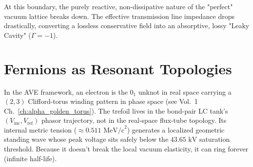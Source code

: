 At this boundary, the purely reactive, non-dissipative nature of the "perfect" vacuum lattice breaks down. The effective transmission line impedance drops drastically, converting a lossless conservative field into an absorptive, lossy "Leaky Cavity" ($\Gamma = -1$\gammaundeclared{}).


\section{Fermions as Resonant Topologies}
In the AVE framework, an electron is the $0_1$ unknot in real space carrying a $(2, 3)$ Clifford-torus winding pattern in phase space (see Vol.~1 Ch.~\ref{ch:alpha_golden_torus}). The trefoil lives in the bond-pair LC tank's $(V_{\text{inc}}, V_{\text{ref}})$ phasor trajectory, not in the real-space flux-tube topology. Its internal metric tension ($\approx 0.511 \text{ MeV/c}^2$) generates a localized geometric standing wave whose peak voltage sits safely below the $43.65 \text{ kV}$ saturation threshold. Because it doesn't break the local vacuum elasticity, it can ring forever (infinite half-life).

